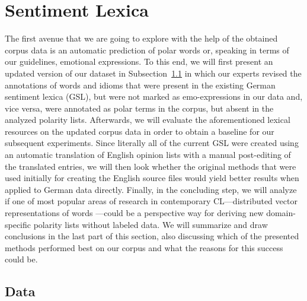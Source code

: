 

\section{Sentiment Lexica}\label{sec:snt:lex}

The first avenue that we are going to explore with the help of the
obtained corpus data is an automatic prediction of polar words or,
speaking in terms of our guidelines, emotional expressions.  To this
end, we will first present an updated version of our dataset in
Subsection~\ref{subsec:snt-lex:data} in which our experts revised the
annotations of words and idioms that were present in the existing
German sentiment lexica (GSL), but were not marked as emo-expressions
in our data and, vice versa, were annotated as polar terms in the
corpus, but absent in the analyzed polarity lists.  Afterwards, we
will evaluate the aforementioned lexical resources on the updated
corpus data in order to obtain a baseline for our subsequent
experiments.  Since literally all of the current GSL were created
using an automatic translation of English opinion lists with a manual
post-editing of the translated entries, we will then look whether the
original methods that were used initially for creating the English
source files would yield better results when applied to German data
directly.  Finally, in the concluding step, we will analyze if one of
most popular areas of research in contemporary CL---distributed vector
representations of words \cite{Mikolov:13}---could be a perspective
way for deriving new domain-specific polarity lists without labeled
data.  We will summarize and draw conclusions in the last part of this
section, also discussing which of the presented methods performed best
on our corpus and what the reasons for this success could be.

\subsection{Data}\label{subsec:snt-lex:data}

